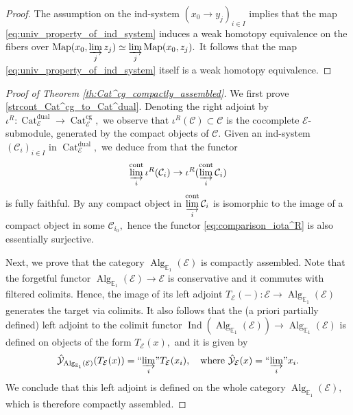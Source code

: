 \documentclass[11pt,leqno]{amsart}
\numberwithin{equation}{section}
\def\Map{\operatorname{Map}}
\newcommand{\indlim}[1][]{\mathop{\varinjlim}\limits_{#1}}
\newcommand{\inddlim}[1][]{{``{\indlim[#1]}"}}
\newcommand{\Cat}{\operatorname{Cat}}
\newcommand{\cont}{\operatorname{cont}}
\newcommand{\cg}{\operatorname{cg}}
\newcommand{\dual}{\operatorname{dual}}
\newcommand{\bE}{{\mathbb E}}
\newcommand{\cC}{{\mathcal C}}
\newcommand{\cE}{{\mathcal E}}
\newcommand{\cY}{{\mathcal Y}}
\newcommand{\Ind}{\operatorname{Ind}}
\newcommand{\Alg}{\operatorname{Alg}}
\begin{document}
\begin{proof}
The assumption on the ind-system $(x_0\to y_j)_{i\in I}$ implies that the map \eqref{eq:univ_property_of_ind_system} induces a weak homotopy equivalence on the fibers over $\Map(x_0,\indlim[j]z_j)\simeq\indlim[j]\Map(x_0,z_j).$ It follows that the map \eqref{eq:univ_property_of_ind_system} itself is a weak homotopy equivalence.
\end{proof}

\begin{proof}[Proof of Theorem \ref{th:Cat^cg_compactly_assembled}]
We first prove \ref{strcont_Cat^cg_to_Cat^dual}. Denoting the right adjoint by $\iota^R:\Cat_{\cE}^{\dual}\to\Cat_{\cE}^{\cg},$ we observe that $\iota^R(\cC)\subset\cC$ is the cocomplete $\cE$-submodule, generated by the compact objects of $\cC.$ Given an ind-system $(\cC_i)_{i\in I}$ in $\Cat_{\cE}^{\dual},$ we deduce from \cite[Proposition 1.67]{E24} that the functor
\begin{equation}\label{eq:comparison_iota^R}
\indlim[i]^{\cont}\iota^R(\cC_i)\to\iota^R(\indlim[i]^{\cont}\cC_i)
\end{equation}
is fully faithful. By \cite[Proposition 1.71]{E24} any compact object in $\indlim[i]^{\cont}\cC_i$ is isomorphic to the image of a compact object in some $\cC_{i_0},$ hence the functor \eqref{eq:comparison_iota^R} is also essentially surjective.

Next, we prove that the category $\Alg_{\bE_1}(\cE)$ is compactly assembled. Note that the forgetful functor $\Alg_{\bE_1}(\cE)\to\cE$ is conservative and it commutes with filtered colimits. Hence, the image of its left adjoint $T_{\cE}(-):\cE\to\Alg_{\bE_1}(\cE)$ generates the target via colimits. It also follows that the (a priori partially defined) left adjoint to the colimit functor $\Ind(\Alg_{\bE_1}(\cE))\to \Alg_{\bE_1}(\cE)$ is defined on objects of the form $T_{\cE}(x),$ and it is given by
\begin{equation*}
\hat{\cY}_{\Alg_{\bE_1}(\cE)}(T_{\cE}(x))=\inddlim[i] T_{\cE}(x_i),\quad\text{where }\hat{\cY}_{\cE}(x)=\inddlim[i]x_i.
\end{equation*}
We conclude that this left adjoint is defined on the whole category $\Alg_{\bE_1}(\cE),$ which is therefore compactly assembled.


\end{proof}
\end{document}
